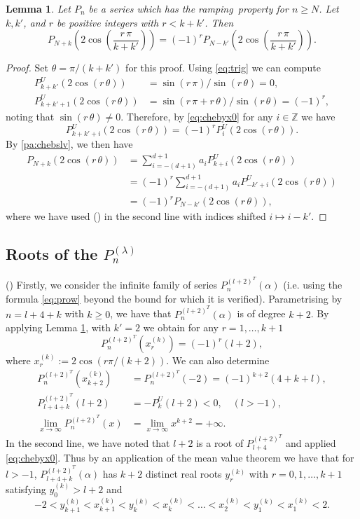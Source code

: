 \documentclass{article}
\newtheorem{lemma}[theorem]{Lemma}
\theoremstyle{definition}
\newcommand{\mdef}{\refstepcounter{theorem}       \medskip \noindent ({\bf \thetheorem}) }
\newcommand{\ramping}{ramping}
\def\a{\alpha}
\def\l{\lambda}
\def\Z{\mathbb{Z}}
\def\th{\theta}
\numberwithin{equation}{subsection}
\begin{document}
\begin{lemma}\label{lem:roots} 
Let $P_n$ be a series which has the \ramping\ property for $n\geq N$. Let $k, k'$, and $ r$ be positive integers with $r<k+k'$. Then
\[P_{N+k}\left(2 \cos \left(\frac{r \, \pi}{k+k'}\right)\right)= (-1)^{r} P_{N-k'}\left(2 \cos \left(\frac{r \, \pi}{k+k'}\right)\right).  \]
\end{lemma}
\begin{proof} Set $\th=\pi/(k+k')$ for this proof. Using \eqref{eq:trig} we can compute
\
\begin{align*}P^U_{k+k'}\left(2 \cos \left(r \, \th\right)\right)&= \sin\left( r \, \pi \right)/\sin\left( r \, \th \right)=0,\\
    P^U_{k+k'+1}\left(2 \cos \left(r\, \th \right)\right)&= \sin\left( r \, \pi +r \, \th \right)/\sin\left(r\,\th \right)=(-1)^r,
\end{align*}
noting that $\sin\left(r\,\th\right)\neq 0$. Therefore, by \eqref{eq:chebyx0} for any $i\in \Z $ we have
\[
P^U_{k+k'+i}\left(2 \cos \left(r\, \th\right)\right)=(-1)^r P_i^{U}\left(2 \cos (r\, \th) \right).\tag{\Celtcross}\]
By \ref{pa:chebslv}, we then have
\begin{align*}    P_{N+k}(2 \cos(r\, \th) )&=\sum_{i=-(d+1)}^{d+1} a_i P^U_{k+i}(2 \cos(r\, \th) )\\
&=(-1)^r\sum_{i=-(d+1)}^{d+1} a_i  P^U_{-k'+i}(2 \cos(r\, \th) )\\
&= (-1)^r P_{N-k'}(2 \cos(r\, \th) ),
\end{align*}
where we have used (\Celtcross) in the second line with indices shifted $i\mapsto i-k'$.
\end{proof}

\subsection{Roots of the $P^{(\l)}_n$}\label{ss:roots}

\mdef Firstly, we consider the infinite family of series $P^{(l+2)^T}_{n}(\a)$ (i.e. using the formula \eqref{eq:prow} beyond the bound for which it is verified). Parametrising by $n=l+4+k$ with $k\geq 0$, we have that $P^{(l+2)^T}_{n}(\a)$ is of degree $k+2$.  By applying Lemma \ref{lem:roots}, with $k'=2$ we obtain for any $r=1,\dots,k+1$ 
\[P^{(l+2)^T}_{n}( x^{(k)}_{r})= (-1)^r(l+2),\]
where $x^{(k)}_{r}:=2\cos(r \pi/(k+2))$. We can also determine
\begin{align*}P^{(l+2)^T}_{n}( x^{(k)}_{k+2})&=P^{(l+2)^T}_{n}( -2)=(-1)^{k+2} (4 + k + l),\\
P^{(l+2)^T}_{l+4+k}( l+2 )&=-P^{U}_{k}(l+2)<0, \quad (l>-1),\\
\lim_{x\to \infty } P^{(l+2)^T}_{n}( x)&=\lim_{x\to \infty } x^{k+2}=+\infty.
\end{align*}
In the second line, we have noted that $l+2$ is a root of $P_{l+4}^{(l+2)^T}$ and applied \eqref{eq:chebyx0}. Thus by an application of the mean value theorem we have that for $l>-1$, $P^{(l+2)^T}_{l+4+k}(\a)$ has $k+2$ distinct real roots $y^{(k)}_{r}$ with $r=0,1,\dots,k+1$ satisfying $y_0^{(k)}>l+2$ and 
\[-2<y^{(k)}_{k+1}<x^{(k)}_{k+1}<y^{(k)}_{k}<x^{(k)}_{k}< \dots <x^{(k)}_{2}<y^{(k)}_{1}<x^{(k)}_{1}<2.\]
\end{document}
